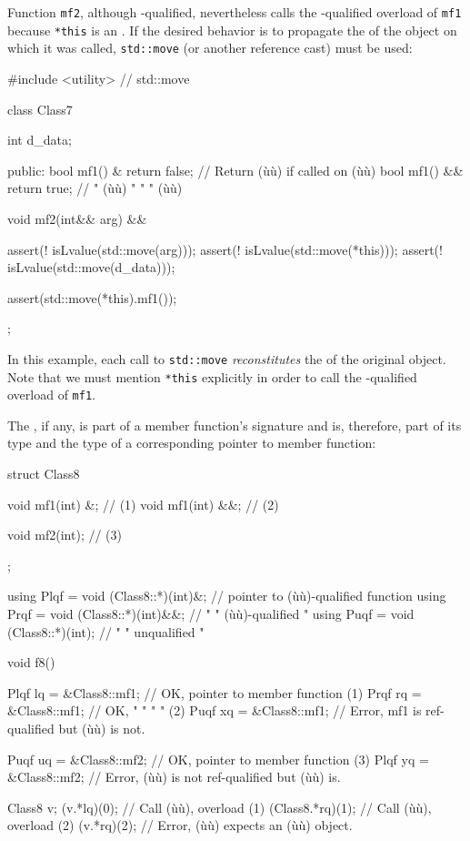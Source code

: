 \noindent Function \lstinline!mf2!, although -qualified, nevertheless
calls the -qualified overload of \lstinline!mf1! because
\lstinline!*this! is an . If the desired behavior is to
propagate the  of the object on which it was
called, \lstinline!std::move! (or another reference cast) must be used:

\begin{emcppslisting}
#include <utility>  // std::move

class Class7
{
    int d_data;

public:
    bool mf1() &  { return false; }  // Return (ù{}ù) if called on (ù{}ù)
    bool mf1() && { return true; }   //    "   (ù{}ù)   "    "    " (ù{}ù)

    void mf2(int&& arg) &&
    {
        assert(! isLvalue(std::move(arg)));
        assert(! isLvalue(std::move(*this)));
        assert(! isLvalue(std::move(d_data)));

        assert(std::move(*this).mf1());
    }
};
\end{emcppslisting}
    

\noindent In this example, each call to \lstinline!std::move! \emph{reconstitutes}
the  of the original object. Note that we must
mention \lstinline!*this! explicitly in order to call the
-qualified overload of \lstinline!mf1!.

The , if any, is part of a member function's
signature and is, therefore, part of its type and the type of a
corresponding pointer to member function:

\begin{emcppslisting}
struct Class8
{
    void mf1(int) &;   // (1)
    void mf1(int) &&;  // (2)

    void mf2(int);     // (3)
};

using Plqf = void (Class8::*)(int)&;   // pointer to (ù{}ù)-qualified function
using Prqf = void (Class8::*)(int)&&;  //    "     " (ù{}ù)-qualified     "
using Puqf = void (Class8::*)(int);    //    "     " unqualified            "

void f8()
{
    Plqf lq = &Class8::mf1;  // OK, pointer to member function (1)
    Prqf rq = &Class8::mf1;  // OK,    "     "    "       "    (2)
    Puqf xq = &Class8::mf1;  // Error, mf1 is ref-qualified but (ù{}ù) is not.

    Puqf uq = &Class8::mf2;  // OK, pointer to member function (3)
    Plqf yq = &Class8::mf2;  // Error, (ù{}ù) is not ref-qualified but (ù{}ù) is.

    Class8 v;
    (v.*lq)(0);         // Call (ù{}ù), overload (1)
    (Class8{}.*rq)(1);  // Call (ù{}ù), overload (2)
    (v.*rq)(2);         // Error, (ù{}ù) expects an (ù{}ù) object.
}
\end{emcppslisting}
    

